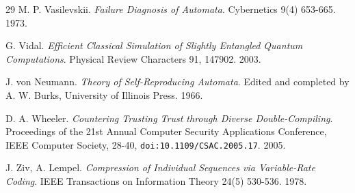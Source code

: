 \begin{thebibliography}{29}
M. P. Vasilevskii. \emph{Failure Diagnosis of Automata}. Cybernetics 9(4) 653-665. 1973.

G. Vidal. \emph{Efficient Classical Simulation of Slightly Entangled Quantum Computations}. Physical Review Characters 91, 147902. 2003.

J. von Neumann. \emph{Theory of Self-Reproducing Automata}. Edited and completed by A. W. Burks, University of Illinois Press. 1966.

D. A. Wheeler. \emph{Countering Trusting Trust through Diverse Double-Compiling}. Proceedings of the 21st Annual Computer Security Applications Conference, IEEE Computer Society, 28-40, \texttt{doi:10.1109/\allowbreak{}CSAC.2005.17}. 2005.

J. Ziv, A. Lempel. \emph{Compression of Individual Sequences via Variable-Rate Coding}. IEEE Transactions on Information Theory 24(5) 530-536. 1978.

\end{thebibliography}
